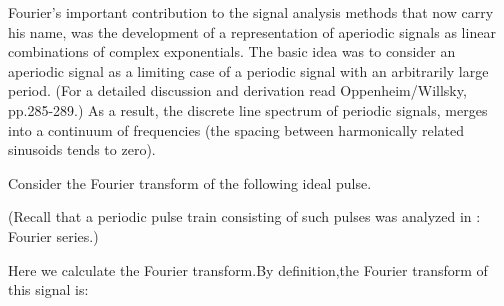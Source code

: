 \documentclass{article}
\begin{document}
\begin{CellGroup}


Fourier's important contribution to the signal analysis methods that now carry his name, was the development of a representation of aperiodic signals
as linear combinations of complex exponentials. The basic idea was to consider an aperiodic signal as a limiting case of a periodic signal with an
arbitrarily large period. (For a detailed discussion and derivation read Oppenheim/Willsky, pp.285-289.) As a result, the discrete line spectrum
of periodic signals, merges into a continuum of frequencies (the spacing between harmonically related sinusoids tends to zero).

Consider the Fourier transform of the following ideal pulse. 


(Recall that a periodic pulse train consisting of such pulses was analyzed in : Fourier series.)



\begin{CellGroup}

\end{CellGroup}
Here we calculate the Fourier transform.By definition,the Fourier transform of this signal is:

\begin{CellGroup}
\dispSFoutmath{\frac{2\multsp \sin [0.5\multsp \omega ]}{\omega }}

\end{CellGroup}
\begin{CellGroup}


\end{CellGroup}
\end{CellGroup}
\end{document}
